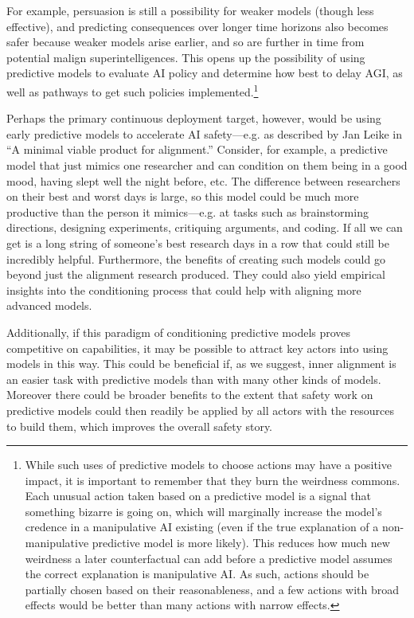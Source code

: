 {{For example, persuasion is still a possibility for weaker models (though less effective), and predicting consequences over longer time horizons also becomes safer because weaker models arise earlier, and so are further in time from potential malign superintelligences. This opens up the possibility of using predictive models to evaluate AI policy and determine how best to delay AGI, as well as pathways to get such policies implemented.\footnote{While such uses of predictive models to choose actions may have a positive impact, it is important to remember that they burn the weirdness commons. Each unusual action taken based on a predictive model is a signal that something bizarre is going on, which will marginally increase the model's credence in a manipulative AI existing (even if the true explanation of a non-manipulative predictive model is more likely). This reduces how much new weirdness a later counterfactual can add before a predictive model assumes the correct explanation is manipulative AI. As such, actions should be partially chosen based on their reasonableness, and a few actions with broad effects would be better than many actions with narrow effects.}

Perhaps the primary continuous deployment target, however, would be using early predictive models to accelerate AI safety---e.g. as described by Jan Leike in ``A minimal viable product for alignment\cite{TODO: cite https://www.alignmentforum.org/posts/fYf9JAwa6BYMt8GBj/link-a-minimal-viable-product-for-alignment}.'' Consider, for example, a predictive model that just mimics one researcher and can condition on them being in a good mood, having slept well the night before, etc. The difference between researchers on their best and worst days is large, so this model could be much more productive than the person it mimics---e.g. at tasks such as brainstorming directions, designing experiments, critiquing arguments, and coding. If all we can get is a long string of someone's best research days in a row that could still be incredibly helpful. Furthermore, the benefits of creating such models could go beyond just the alignment research produced. They could also yield empirical insights into the conditioning process that could help with aligning more advanced models.

Additionally, if this paradigm of conditioning predictive models proves competitive on capabilities, it may be possible to attract key actors into using models in this way. This could be beneficial if, as we suggest, inner alignment is an easier task with predictive models than with many other kinds of models. Moreover there could be broader benefits to the extent that safety work on predictive models could then readily be applied by all actors with the resources to build them, which improves the overall safety story.

}}
